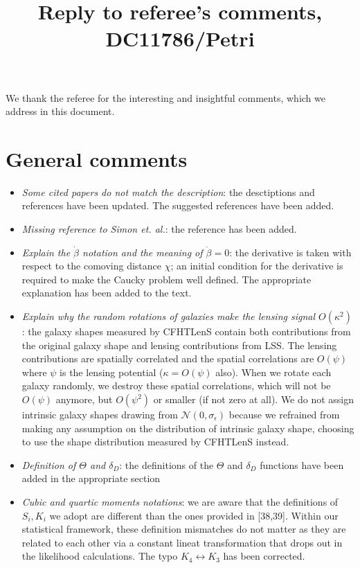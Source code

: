 \documentclass[11pt]{article}
\begin{document}
\title{Reply to referee's comments, DC11786/Petri}
\author{}
\date{}

\maketitle

\noindent
We thank the referee for the interesting and insightful comments, which we address in this document.

\section*{General comments}

\begin{itemize}
\item \textit{Some cited papers do not match the description}: the desctiptions and references have been updated. The suggested references have been added.
\item \textit{Missing reference to Simon et. al.}: the reference has been added.
\item \textit{Explain the $\dot{\beta}$ notation and the meaning of $\dot{\beta}=0$}: the derivative is taken with respect to the comoving distance $\chi$; an initial condition for the derivative is required to make the Caucky problem well defined. The appropriate explanation has been added to the text.
\item \textit{Explain why the random rotations of galaxies make the lensing signal $O(\kappa^2)$}: the galaxy shapes measured by CFHTLenS contain both contributions from the original galaxy shape and lensing contributions from LSS. The lensing contributions are spatially correlated and the spatial correlations are $O(\psi)$ where $\psi$ is the lensing potential ($\kappa=O(\psi)$ also). When we rotate each galaxy randomly, we destroy these spatial correlations, which will not be $O(\psi)$ anymore, but $O(\psi^2)$ or smaller (if not zero at all). We do not assign intrinsic galaxy shapes drawing from $\mathcal{N}(0,\sigma_\epsilon)$ because we refrained from making any assumption on the distribution of intrinsic galaxy shape, choosing to use the shape distribution measured by CFHTLenS instead.  
\item \textit{Definition of $\Theta$ and $\delta_D$}: the definitions of the $\Theta$ and $\delta_D$ functions have been added in the appropriate section
\item \textit{Cubic and quartic moments notations}: we are aware that the definitions of $S_i,K_i$ we adopt are different than the ones provided in [38,39]. Within our statistical framework, these definition mismatches do not matter as they are related to each other via a constant lineat transformation that drops out in the likelihood calculations. The typo $K_4\leftrightarrow K_3$ has been corrected. 

\end{itemize}
\end{document}
